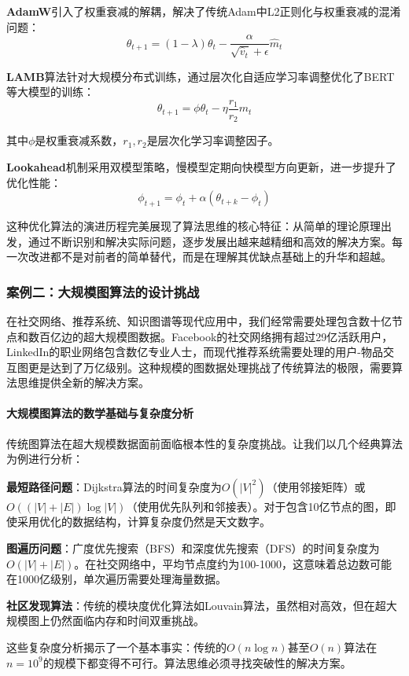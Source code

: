 \textbf{AdamW}引入了权重衰减的解耦，解决了传统Adam中L2正则化与权重衰减的混淆问题：
$$\theta_{t+1} = (1-\lambda) \theta_t - \frac{\alpha}{\sqrt{\hat{v}_t} + \epsilon} \hat{m}_t$$

\textbf{LAMB}算法针对大规模分布式训练，通过层次化自适应学习率调整优化了BERT等大模型的训练：
$$\theta_{t+1} = \phi \theta_t - \eta \frac{r_1}{r_2} m_t$$

其中$\phi$是权重衰减系数，$r_1, r_2$是层次化学习率调整因子。

\textbf{Lookahead}机制采用双模型策略，慢模型定期向快模型方向更新，进一步提升了优化性能：
$$\phi_{t+1} = \phi_t + \alpha (\theta_{t+k} - \phi_t)$$

这种优化算法的演进历程完美展现了算法思维的核心特征：从简单的理论原理出发，通过不断识别和解决实际问题，逐步发展出越来越精细和高效的解决方案。每一次改进都不是对前者的简单替代，而是在理解其优缺点基础上的升华和超越。

\subsubsection{案例二：大规模图算法的设计挑战}

 在社交网络、推荐系统、知识图谱等现代应用中，我们经常需要处理包含数十亿节点和数百亿边的超大规模图数据。Facebook的社交网络拥有超过29亿活跃用户，LinkedIn的职业网络包含数亿专业人士，而现代推荐系统需要处理的用户-物品交互图更是达到了万亿级别。这种规模的图数据处理挑战了传统算法的极限，需要算法思维提供全新的解决方案。

\paragraph{大规模图算法的数学基础与复杂度分析}
传统图算法在超大规模数据面前面临根本性的复杂度挑战。让我们以几个经典算法为例进行分析：

\textbf{最短路径问题}：Dijkstra算法的时间复杂度为$O(|V|^2)$（使用邻接矩阵）或$O((|V|+|E|)\log|V|)$（使用优先队列和邻接表）。对于包含10亿节点的图，即使采用优化的数据结构，计算复杂度仍然是天文数字。

\textbf{图遍历问题}：广度优先搜索（BFS）和深度优先搜索（DFS）的时间复杂度为$O(|V|+|E|)$。在社交网络中，平均节点度约为100-1000，这意味着总边数可能在1000亿级别，单次遍历需要处理海量数据。

\textbf{社区发现算法}：传统的模块度优化算法如Louvain算法，虽然相对高效，但在超大规模图上仍然面临内存和时间双重挑战。

这些复杂度分析揭示了一个基本事实：传统的$O(n\log n)$甚至$O(n)$算法在$n=10^9$的规模下都变得不可行。算法思维必须寻找突破性的解决方案。

